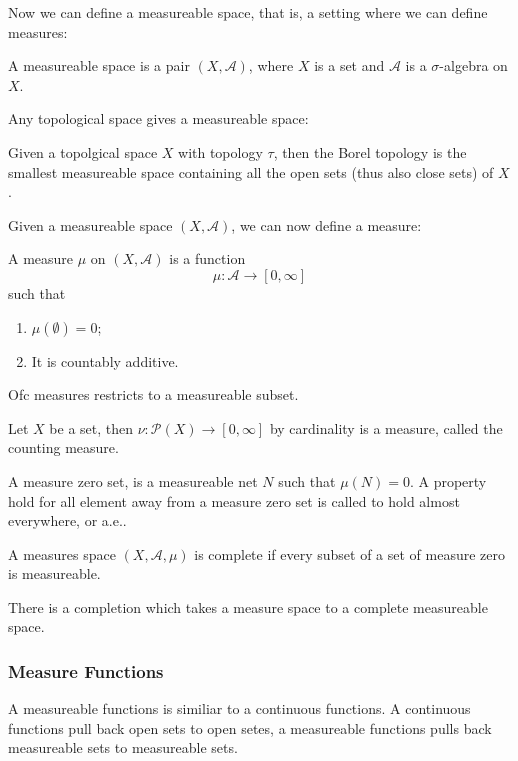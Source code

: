 \documentclass[main.tex]{subfiles}
\begin{document}
Now we can define a measureable space, that is, a setting where we can define measures:

\begin{definition}
A measureable space is a pair $(X, \mathcal{A})$, where $X$ is a set and $\mathcal{A}$ is a $\sigma$-algebra on $X$.
\end{definition}

Any topological space gives a measureable space:

\begin{definition}
Given a topolgical space $X$ with topology $\tau$, then the Borel topology is the smallest measureable space containing all the open sets (thus also close sets) of $X$. 
\end{definition}

Given a measureable space $(X, \mathcal{A})$, we can now define a measure:

\begin{definition}
A measure $\mu$ on $(X, \mathcal{A})$ is a function 
$$
\mu: \mathcal{A} \rightarrow [0, \infty]
$$
such that 
\begin{enumerate}
    \item $\mu(\emptyset) = 0$;
    \item It is countably additive.
\end{enumerate}
\end{definition}

Ofc measures restricts to a measureable subset. 

\begin{example}
Let $X$ be a set, then $\nu: \mathcal{P}(X) \rightarrow [0, \infty]$ by cardinality is a measure, called the counting measure. 
\end{example}

A measure zero set, is a measureable net $N$ such that $\mu(N) = 0$. A property hold for all element away from a measure zero set is called to hold almost everywhere, or a.e..

\begin{definition}
A measures space $(X, \mathcal{A}, \mu)$ is complete if every subset of a set of measure zero is measureable.
\end{definition}

There is a completion which takes a measure space to a complete measureable space.

\subsubsection{Measure Functions}
A measureable functions is similiar to a continuous functions. A continuous functions pull back open sets to open setes, a measureable functions pulls back measureable sets to measureable sets.
\end{document}
